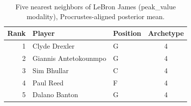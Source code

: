 \begin{table}[htbp]
  \centering\small
  \begin{tabular}{rllc}
    \toprule
    Rank & Player & Position & Archetype \\
    \midrule
    1 & Clyde Drexler & G & 4 \\
    2 & Giannis Antetokounmpo & G & 4 \\
    3 & Sim Bhullar & C & 4 \\
    4 & Paul Reed & F & 4 \\
    5 & Dalano Banton & G & 4 \\
    \bottomrule
  \end{tabular}
  \caption{Five nearest neighbors of LeBron James (peak_value modality), Procrustes-aligned posterior mean.}
  \label{tab:LeBron_James_neighbors_peak_value}
\end{table}

